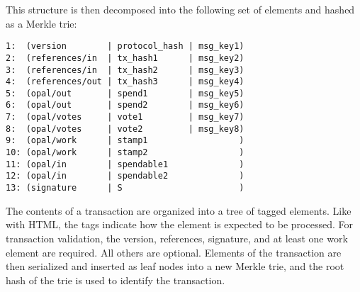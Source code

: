 \documentclass[10pt,twocolumn]{article}
\begin{document}
This structure is then decomposed into the following set of elements and hashed as a Merkle trie:

\begin{verbatim}
1:  (version        | protocol_hash | msg_key1)
2:  (references/in  | tx_hash1      | msg_key2)
3:  (references/in  | tx_hash2      | msg_key3)
4:  (references/out | tx_hash3      | msg_key4)
5:  (opal/out       | spend1        | msg_key5)
6:  (opal/out       | spend2        | msg_key6)
7:  (opal/votes     | vote1         | msg_key7)
8:  (opal/votes     | vote2         | msg_key8)
9:  (opal/work      | stamp1                  )
10: (opal/work      | stamp2                  )
11: (opal/in        | spendable1              )
12: (opal/in        | spendable2              )
13: (signature      | S                       )
\end{verbatim}

The contents of a transaction are organized into a tree of tagged elements.  Like with HTML, the tags indicate how the element is expected to be processed.  For transaction validation, the version, references, signature, and at least one work element are required.  All others are optional.  Elements of the transaction are then serialized and inserted as leaf nodes into a new Merkle trie, and the root hash of the trie is used to identify the transaction.
\end{document}
